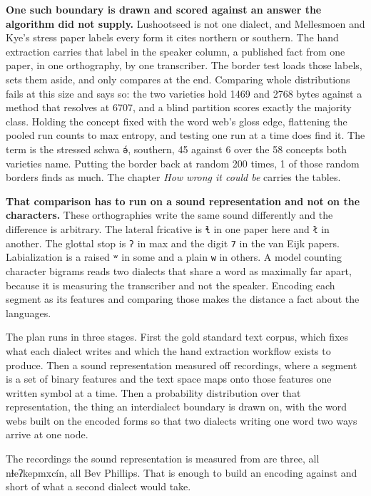 \textbf{One such boundary is drawn and scored against an answer the algorithm did not supply.} Lushootseed is not one dialect, and Mellesmoen and Kye's stress paper \cite{src:Mellesmoen-and-Kye-2026} labels every form it cites northern or southern. The hand extraction carries that label in the speaker column, a published fact from one paper, in one orthography, by one transcriber. The border test loads those labels, sets them aside, and only compares at the end. Comparing whole distributions fails at this size and says so: the two varieties hold 1469 and 2768 bytes against a method that resolves at 6707, and a blind partition scores exactly the majority class. Holding the concept fixed with the word web's gloss edge, flattening the pooled run counts to max entropy, and testing one run at a time does find it. The term is the stressed schwa \texttt{ə́}, southern, 45 against 6 over the 58 concepts both varieties name. Putting the border back at random 200 times, 1 of those random borders finds as much. The chapter \emph{How wrong it could be} carries the tables.

\textbf{That comparison has to run on a sound representation and not on the characters.} These orthographies write the same sound differently and the difference is arbitrary. The lateral fricative is \texttt{ɬ} in one paper here and \texttt{ł} in another. The glottal stop is \texttt{ʔ} in max and the digit \texttt{7} in the van Eijk papers. Labialization is a raised \texttt{ʷ} in some and a plain \texttt{w} in others. A model counting character bigrams reads two dialects that share a word as maximally far apart, because it is measuring the transcriber and not the speaker. Encoding each segment as its features and comparing those makes the distance a fact about the languages.

The plan runs in three stages. First the gold standard text corpus, which fixes what each dialect writes and which the hand extraction workflow exists to produce. Then a sound representation measured off recordings, where a segment is a set of binary features and the text space maps onto those features one written symbol at a time. Then a probability distribution over that representation, the thing an interdialect boundary is drawn on, with the word webs built on the encoded forms so that two dialects writing one word two ways arrive at one node.

The recordings the sound representation is measured from are three, all nɬeʔkepmxcín, all Bev Phillips. That is enough to build an encoding against and short of what a second dialect would take.

